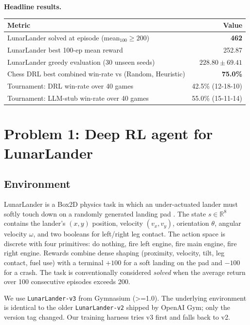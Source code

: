 \documentclass[11pt,a4paper]{article}
\begin{document}
\vspace{4pt}
\noindent\textbf{Headline results.}
\begin{center}\small
\begin{tabular}{lr}
\toprule
\textbf{Metric} & \textbf{Value} \\
\midrule
LunarLander solved at episode (mean$_{100}\!\geq\!200$) & \textbf{462} \\
LunarLander best 100-ep mean reward & 252.87 \\
LunarLander greedy evaluation (30 unseen seeds) & $228.80 \pm 69.41$ \\
Chess DRL best combined win-rate vs (Random, Heuristic) & \textbf{75.0\%} \\
Tournament: DRL win-rate over 40 games & 42.5\% (12-18-10) \\
Tournament: LLM-stub win-rate over 40 games & 55.0\% (15-11-14) \\
\bottomrule
\end{tabular}
\end{center}

\newpage
\section{Problem 1: Deep RL agent for LunarLander}

\subsection{Environment}
LunarLander is a Box2D physics task in which an under-actuated lander
must softly touch down on a randomly generated landing pad
\cite{gymnasium}. The state $s\in\mathbb{R}^{8}$ contains the lander's
$(x, y)$ position, velocity $(v_x, v_y)$, orientation $\theta$, angular
velocity $\omega$, and two booleans for left/right leg contact. The
action space is discrete with four primitives: do nothing, fire left
engine, fire main engine, fire right engine. Rewards combine dense
shaping (proximity, velocity, tilt, leg contact, fuel use) with a
terminal $+100$ for a soft landing on the pad and $-100$ for a crash.
The task is conventionally considered \emph{solved} when the average
return over 100 consecutive episodes exceeds 200.

We use \texttt{LunarLander-v3} from Gymnasium (\textgreater{}=1.0). The
underlying environment is identical to the older \texttt{LunarLander-v2}
shipped by OpenAI Gym; only the version tag changed. Our training
harness tries v3 first and falls back to v2.
\end{document}
